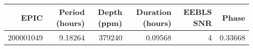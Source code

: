 \begin{tabular}{rrrrrr}
\hline
      EPIC &   Period (hours) &   Depth (ppm) &   Duration (hours) &   EEBLS SNR &   Phase \\
\hline
 200001049 &          9.18264 &        379240 &            0.09568 &           4 & 0.33668 \\
\hline
\end{tabular}